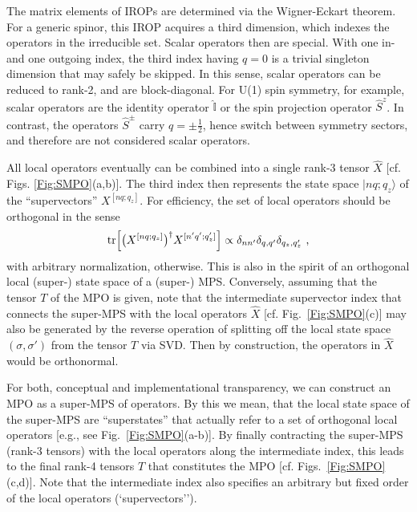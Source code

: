 \documentclass[aps,prx,twocolumn,showpacs,psfig,superscriptaddress,longbibliography]{revtex4-1}
\newcommand{\Fig}[1]{Fig.~\ref{#1}}
\begin{document}
The matrix elements of IROPs are determined via the Wigner-Eckart
theorem. For a generic spinor, this IROP acquires a third dimension,
which indexes the operators in the irreducible set.  Scalar
operators then are special.  With one in- and one outgoing index,
the third index having $q=0$ is a trivial singleton dimension that
may safely be skipped.  In this sense, scalar operators can be
reduced to rank-2, and are block-diagonal.  For U(1) spin symmetry,
for example, scalar operators are the identity operator
$\hat{\mathbb{I}}$ or the spin projection operator $\hat{S}^z$.  In
contrast, the operators $\hat{S}^\pm$ carry $q=\pm\tfrac{1}{2}$,
hence switch between symmetry sectors, and therefore are not
considered scalar operators.

All local operators eventually can be combined into a single rank-3
tensor $\hat{X}$ [cf. Figs.  \ref{Fig:SMPO}(a,b)].  The third index
then represents the state space $|nq;q_z\rangle$
\cite{Weichselbaum.a:2012:QSpace} of the ``supervectors''
$X^{[nq;q_z]}$. For efficiency, the set of local operators should be
orthogonal in the sense
%
\begin{eqnarray}
   \mathrm{tr} \Bigl[
   \bigl( X^{[nq;q_z]} \bigr)^\dagger X^{[n'q';q'_z]}\Bigr]
   \propto \delta_{nn'} \delta_{q,q'} \delta_{q_z,q'_z}
\text{ ,}\label{eq:ortho:lops}
\end{eqnarray}
%
with arbitrary normalization, otherwise.  This is also in the spirit
of an orthogonal local (super-) state space of a \mbox{(super-)}
MPS.  Conversely, assuming that the tensor $T$ of the MPO is given,
note that the intermediate supervector index that connects the
super-MPS with the local operators $\hat{X}$ [cf. \Fig{Fig:SMPO}(c)]
may also be generated by the reverse operation of splitting off the
local state space $(\sigma,\sigma')$ from the tensor $T$ via SVD.
Then by construction, the operators in $\hat{X}$ would be
orthonormal.

For both, conceptual and implementational transparency, we can
construct an MPO as a super-MPS of operators.  By this we mean, that
the local state space of the super-MPS are ``superstates'' that
actually refer to a set of orthogonal local operators [e.g., see
\Fig{Fig:SMPO}(a-b)].  By finally contracting the super-MPS (rank-3
tensors) with the local operators along the intermediate index, this
leads to the final rank-4 tensors $T$ that constitutes the MPO [cf.
Figs.~\ref{Fig:SMPO}(c,d)].  Note that the intermediate index also
specifies an arbitrary but fixed order of the local operators
(`supervectors'').
\end{document}
